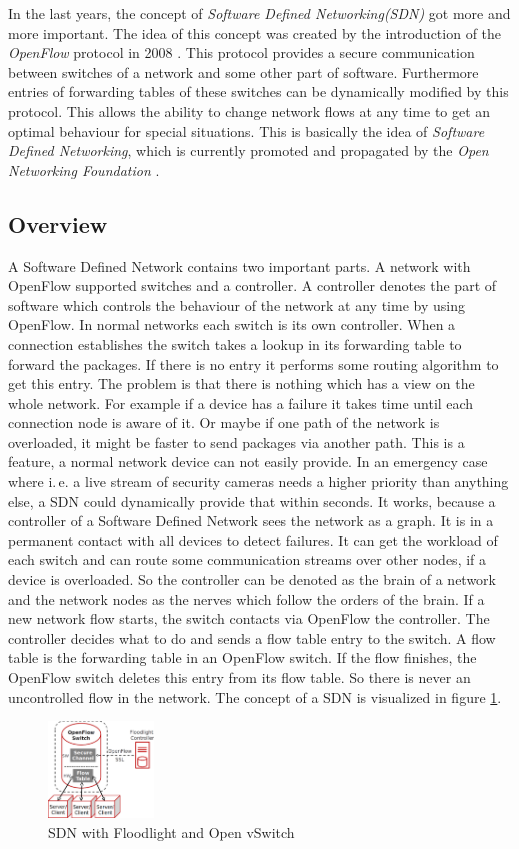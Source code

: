 In the last years, the concept of \textit{Software Defined Networking(SDN)} got more and more important. The idea of this concept was created by the introduction of the \textit{OpenFlow} protocol in 2008 \cite{Mc2008}. This protocol provides a secure communication between switches of a network and some other part of software. Furthermore entries of forwarding tables of these switches can be dynamically modified by this protocol. This allows the ability to change network flows at any time to get an optimal behaviour for special situations. This is basically the idea of \textit{Software Defined Networking}, which is currently promoted and propagated by the \textit{Open Networking Foundation} \cite{onf}. 
\subsection{Overview}
A Software Defined Network contains two important parts. A network with OpenFlow supported switches and a controller. A controller denotes the part of software which controls the behaviour of the network at any time by using OpenFlow. In normal networks each switch is its own controller. When a connection establishes the switch takes a lookup in its forwarding table to forward the packages. If there is no entry it performs some routing algorithm to get this entry. The problem is that there is nothing which has a view on the whole network. For example if a device has a failure it takes time until each connection node is aware of it. Or maybe if one path of the network is overloaded, it might be faster to send packages via another path. This is a feature, a normal network device can not easily provide. In an emergency case where i.\,e. a live stream of security cameras needs a higher priority than anything else, a SDN could dynamically provide that within seconds. It works, because a controller of a Software Defined Network sees the network as a graph. It is in a permanent contact with all devices to detect failures. It can get the workload of each switch and can route some communication streams over other nodes, if a device is overloaded. So the controller can be denoted as the brain of a network and the network nodes as the nerves which follow the orders of the brain. If a new network flow starts, the switch contacts via OpenFlow the controller. The controller decides what to do and sends a flow table entry to the switch. A flow table is the forwarding table in an OpenFlow switch. If the flow finishes, the OpenFlow switch deletes this entry from its flow table. So there is never an uncontrolled flow in the network. The concept of a SDN is visualized in figure \ref{sdn}.\\
\begin{figure}[ht]
\centering
\includegraphics[width=0.25\textwidth]{img/sdn} 

\caption{SDN with Floodlight and Open vSwitch}
\label{sdn}
\end{figure}
 


